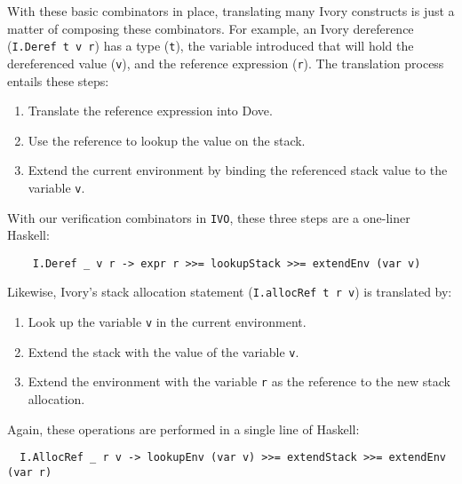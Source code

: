 \documentclass{article}
\begin{document}
With these basic combinators in place, translating many Ivory
constructs is just a matter of composing these combinators.
For example, an Ivory dereference (\texttt{I.Deref t v r})
has a type (\texttt{t}), the variable introduced that
will hold the dereferenced value (\texttt{v}), and
the reference expression (\texttt{r}).  The translation
process entails these steps:

\begin{enumerate}
  \item Translate the reference expression into Dove.
  \item Use the reference to lookup the value on the stack.
  \item Extend the current environment by binding the referenced
        stack value to the variable \texttt{v}.
\end{enumerate}

With our verification combinators in \texttt{IVO}, these
three steps are a one-liner Haskell:

\begin{lstlisting}
    I.Deref _ v r -> expr r >>= lookupStack >>= extendEnv (var v)
\end{lstlisting}

Likewise, Ivory's stack allocation statement (\texttt{I.allocRef t r v})
is translated by:

\begin{enumerate}
  \item Look up the variable \texttt{v} in the current environment.
  \item Extend the stack with the value of the variable \texttt{v}.
  \item Extend the environment with the variable \texttt{r} as the reference to the new stack allocation.
\end{enumerate}

Again, these operations are performed in a single line of Haskell:

\begin{lstlisting}
  I.AllocRef _ r v -> lookupEnv (var v) >>= extendStack >>= extendEnv (var r)
\end{lstlisting}
\end{document}
